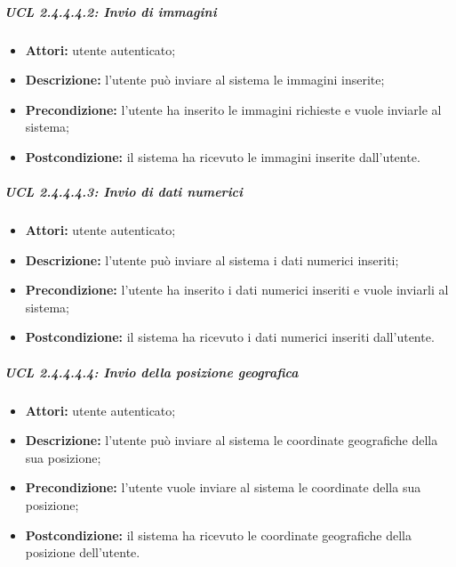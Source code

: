 \subparagraph{UCL 2.4.4.4.2: Invio di immagini}
\begin{itemize}
\item \textbf{Attori:} utente autenticato;
\item \textbf{Descrizione:} l'utente può inviare al sistema le immagini inserite;
\item \textbf{Precondizione:} l'utente ha inserito le immagini richieste e vuole inviarle al sistema;
\item \textbf{Postcondizione:} il sistema ha ricevuto le immagini inserite dall'utente.
\end{itemize}

\subparagraph{UCL 2.4.4.4.3: Invio di dati numerici}
\begin{itemize}
\item \textbf{Attori:} utente autenticato;
\item \textbf{Descrizione:} l'utente può inviare al sistema i dati numerici inseriti;
\item \textbf{Precondizione:} l'utente ha inserito i dati numerici inseriti e vuole inviarli al sistema;
\item \textbf{Postcondizione:} il sistema ha ricevuto i dati numerici inseriti dall'utente.
\end{itemize}

\subparagraph{UCL 2.4.4.4.4: Invio della posizione geografica}
\begin{itemize}
\item \textbf{Attori:} utente autenticato;
\item \textbf{Descrizione:} l'utente può inviare al sistema le coordinate geografiche della sua posizione;
\item \textbf{Precondizione:} l'utente vuole inviare al sistema le coordinate della sua posizione;
\item \textbf{Postcondizione:} il sistema ha ricevuto le coordinate geografiche della posizione dell'utente.
\end{itemize}

